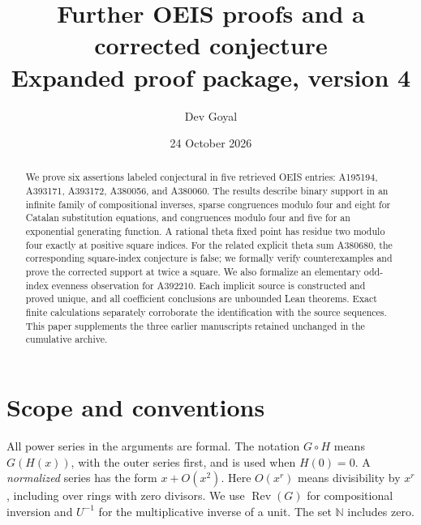 \documentclass[11pt,a4paper]{article}
\title{Further OEIS proofs and a corrected conjecture\\
  \large Expanded proof package, version 4}
\author{Dev Goyal}
\date{24 October 2026}
\theoremstyle{remark}
\newcommand{\N}{\mathbb N}
\newcommand{\Rev}{\operatorname{Rev}}
\begin{document}
\maketitle

\begin{center}
\end{center}

\begin{abstract}
We prove six assertions labeled conjectural in five retrieved OEIS
entries: A195194, A393171, A393172, A380056, and A380060. The results
describe binary support in an infinite family of compositional inverses,
sparse congruences modulo four and eight for Catalan substitution
equations, and congruences modulo four and five for an exponential
generating function. A rational theta fixed point has residue two modulo
four exactly at positive square indices. For the related explicit theta
sum A380680, the corresponding square-index conjecture is false; we
formally verify counterexamples and prove the corrected support at twice
a square. We also formalize an elementary odd-index evenness observation
for A392210. Each implicit source is constructed and proved unique, and
all coefficient conclusions are unbounded Lean theorems. Exact finite
calculations separately corroborate the identification with the source
sequences. This paper supplements the three earlier manuscripts retained
unchanged in the cumulative archive.
\end{abstract}

\section{Scope and conventions}

All power series in the arguments are formal. The notation $G\circ H$
means $G(H(x))$, with the outer series first, and is used when $H(0)=0$.
A \emph{normalized} series has the form $x+O(x^2)$. Here $O(x^r)$ means
divisibility by $x^r$, including over rings with zero divisors. We use
$\Rev(G)$ for compositional inversion and $U^{-1}$ for the multiplicative
inverse of a unit. The set $\N$ includes zero.
\end{document}
